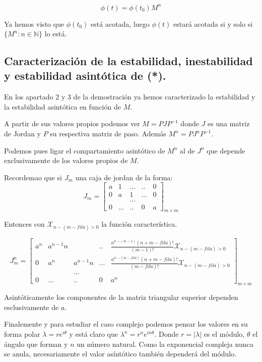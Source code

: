 \documentclass[a4paper , 14pt, spanish ]{article}
\begin{document}
$$\phi(t) = \phi(t_0) M^n$$

Ya hemos visto que $\phi(t_0)$ está acotada, luego  $\phi(t)$ estará acotada si y solo si $\{ M^n : n \in \mathbb N\}$ lo está.


\subsection{ Caracterización de  la estabilidad, inestabilidad y estabilidad asintótica  de (*). }

En los apartado 2 y 3 de la demostración ya hemos caracterizado la estabilidad y la estabilidad asintótica en función de $M.$

A partir de sus valores propios podemos ver $M = P J P^{-1}$ donde $J$  es una matriz de Jordan y $P$ su respectiva matriz de paso.
Además $M^n = P J^n P^{-1}.$

Podemos pues ligar el compartamiento asintótico de $M^n$ al de $J^n$ que depende exclusivamente de los valores propios de $M.$

Recordemao que si $J_m$ una caja de jordan de la forma:  \\
\[
J_m =
\begin{bmatrix}
  a & 1 & ...& .. &  0\\
  0 & a & 1 & ... &  0\\
  &  & ... & & \\
  0 & ... &..& 0 & a
\end{bmatrix}_{m \times m}	
\]

Entonces con $\mathcal{X}_{n-(m-fila)>0}$  la función característica. 

\[
J_m^n =
\begin{bmatrix}
  a^n &  a^{n-1} n && .. & \frac{a^{n-(m-1)} (n+m-fila)!}{(m-1)!} \mathcal{X}_{n-(m-fila)>0} \\
  0 & a^n & a^{n-1} n  & ... &  \frac{a^{n-(m-fila)} (n+m-fila)! }{(m-fila)!} \mathcal{X}_{n-(m-fila)>0} \\
  &  & ... & & \\
  0 & ... &..& 0 & a^n
\end{bmatrix}_{m \times m}	
\]

Asintóticamente los componentes de la matriz triangular superior dependen esclusivamente de $a$.


Finalemente y para estudiar el caso complejo podemos pensar los valores en su forma polar $\lambda = r e^{i \theta}$ y está claro que
$\lambda ^n  = r^n e^{i n \theta}.$ Donde $r = |\lambda|$ es el módulo,  $\theta$ el ángulo que forman y $n$ un número natural. Como la exponencial compleja nunca se anula, necesariamente el valor asíntótico también dependerá del módulo. 
\end{document}
